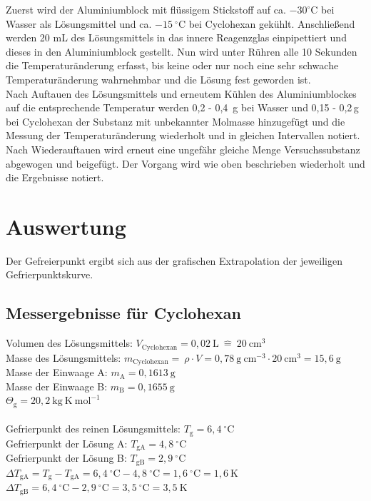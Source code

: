 \documentclass[12pt,a4paper,titlepage,headinclude,bibtotoc]{scrartcl}
\begin{document}
 Zuerst wird der Aluminiumblock mit flüssigem Stickstoff auf ca. $-30 ^\circ\text{C}$ bei Wasser als Lösungsmittel und ca. $-15\ ^\circ\text{C}$ bei Cyclohexan gekühlt. Anschließend werden 20 mL des Lösungsmittels in das innere Reagenzglas einpipettiert und dieses in den Aluminiumblock gestellt. Nun wird unter Rühren alle 10 Sekunden die Temperaturänderung erfasst, bis keine oder nur noch eine sehr schwache Temperaturänderung wahrnehmbar und die Lösung fest geworden ist. \\
 Nach Auftauen des Lösungsmittels und erneutem Kühlen des Aluminiumblockes auf die entsprechende Temperatur werden 0,2 - 0,4\, g bei Wasser und 0,15 - 0,2\,g bei Cyclohexan der Substanz mit unbekannter Molmasse hinzugefügt und die Messung der Temperaturänderung wiederholt und in gleichen Intervallen notiert.\\
Nach Wiederauftauen wird erneut eine ungefähr gleiche Menge Versuchssubstanz abgewogen und beigefügt. Der Vorgang wird wie oben beschrieben wiederholt und die Ergebnisse notiert.\\
 
 
 


\section{Auswertung}

Der Gefreierpunkt ergibt sich aus der grafischen Extrapolation der jeweiligen Gefrierpunktskurve. 

\subsection{Messergebnisse für Cyclohexan}

Volumen des Lösungsmittels: $V_{\mathrm{Cyclohexan}} = 0,02 {~} \mathrm{L}{~}\widehat{=}{~}20 {~}\mathrm{cm^3}$ \\
Masse des Lösungsmittels:  $m_{\mathrm{Cyclohexan}} = {~} \rho \cdot V = 0,78{~} \mathrm{g {~}cm^{-3}} \cdot 20{~} \mathrm{cm^{3}} = 15,6{~}\mathrm{g}$\\
Masse der Einwaage A: $m_\mathrm{A} = 0,1613{~} \mathrm{g}$\\ 
Masse der Einwaage B: $m_\mathrm{B} = 0,1655{~} \mathrm{g}$\\
$\mathit{\Theta }_\mathrm{g} = 20,2 {~} \mathrm{kg{~}K {~} mol^{-1}}$\\\\
Gefrierpunkt des reinen Lösungsmittels: $ T_\mathrm{g} = 6,4 {~}^{\circ}\text{C}$\\
Gefrierpunkt der Lösung A: $ T_\mathrm{gA} = 4,8 {~}^{\circ}\text{C}$\\
Gefrierpunkt der Lösung B: $ T_\mathrm{gB} = 2,9 {~}^{\circ}\text{C}$\\
$ \Delta T _\mathrm{gA} = T_\mathrm{g} - T _\mathrm{gA} = 6,4 {~}^{\circ}\text{C} - 4,8 {~}^{\circ}\text{C} = 1,6 {~}^{\circ}\text{C} = 1,6{~}\mathrm{K} $\\
$ \Delta T _\mathrm{gB} = 6,4 {~}^{\circ}\text{C} - 2,9 {~}^{\circ}\text{C} = 3,5 {~}^{\circ}\text{C} = 3,5 {~} \mathrm{K} $
\end{document}
